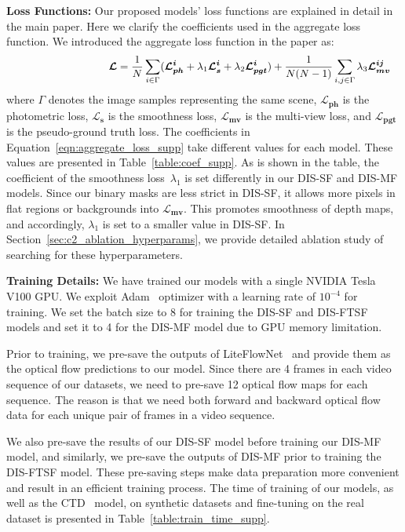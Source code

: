 \bigbreak\noindent\textbf{Loss Functions:} Our proposed models' loss functions are explained in detail in the main paper. Here we clarify the coefficients used in the aggregate loss function. We introduced the aggregate loss function in the paper as:
\begin{multline}
     \shoveright{ \phantom{space space space space } \boldsymbol{\mathcal{L}} = \frac{1}{N}\sum_{i \in \Gamma} (\boldsymbol{\mathcal{L}^{i}_{ph}} + \lambda_{1}\boldsymbol{\mathcal{L}^{i}_{s}} + \lambda_{2}\boldsymbol{\mathcal{L}^{i}_{pgt}})
    + \frac{1}{N(N-1)}\sum_{i,j \in \Gamma} \lambda_{3}\boldsymbol{\mathcal{L}^{ij}_{mv}}}
    \label{eqn:aggregate_loss_supp}
\end{multline}
where $\Gamma$ denotes the image samples representing the same scene, $\boldsymbol{\mathcal{L}_{ph}}$ is the photometric loss, $\boldsymbol{\mathcal{L}_s}$ is the smoothness loss, $\boldsymbol{\mathcal{L}_{mv}}$ is the multi-view loss, and $\boldsymbol{\mathcal{L}_{pgt}}$ is the pseudo-ground truth loss. The coefficients in Equation~\eqref{eqn:aggregate_loss_supp} take different values for each model. These values are presented in Table~\ref{table:coef_supp}. As is shown in the table, the coefficient of the smoothness loss~$\lambda_{1}$ is set differently in our DIS-SF and DIS-MF models. Since our binary masks are less strict in DIS-SF, it allows more pixels in flat regions or backgrounds into $\boldsymbol{\mathcal{L}_{mv}}$. This promotes smoothness of depth maps, and accordingly, $\lambda_{1}$ is set to a smaller value in DIS-SF. In Section~\ref{sec:c2_ablation_hyperparams}, we provide detailed ablation study of searching for these hyperparameters.

\bigbreak\noindent\textbf{Training Details:} We have trained our models with a single NVIDIA Tesla V100 GPU. We exploit Adam~\cite{adam} optimizer with a learning rate of $10^{-4}$ for training. We set the batch size to 8 for training the DIS-SF and DIS-FTSF models and set it to 4 for the DIS-MF model due to GPU memory limitation.

Prior to training, we pre-save the outputs of LiteFlowNet~\cite{hui2018liteflownet} and provide them as the optical flow predictions to our model. Since there are 4 frames in each video sequence of our datasets, we need to pre-save 12 optical flow maps for each sequence. The reason is that we need both forward and backward optical flow data for each unique pair of frames in a video sequence.

We also pre-save the results of our DIS-SF model before training our DIS-MF model, and similarly, we pre-save the outputs of DIS-MF prior to training the DIS-FTSF model. These pre-saving steps make data preparation more convenient and result in an efficient training process. The time of training of our models, as well as the CTD~\cite{riegler2019connecting} model, on synthetic datasets and fine-tuning on the real dataset is presented in Table~\ref{table:train_time_supp}.

